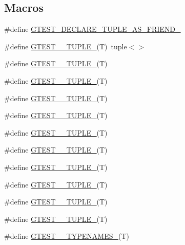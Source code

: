 \subsection*{Macros}
\begin{DoxyCompactItemize}
\item 
\#define \mbox{\hyperlink{gtest-tuple_8h_a2b20671273f514a88a6e9b8328e5f257}{G\+T\+E\+S\+T\+\_\+\+D\+E\+C\+L\+A\+R\+E\+\_\+\+T\+U\+P\+L\+E\+\_\+\+A\+S\+\_\+\+F\+R\+I\+E\+N\+D\+\_\+}}
\item 
\#define \mbox{\hyperlink{gtest-tuple_8h_acecddf48fa29ec4b0199d5a467e89778}{G\+T\+E\+S\+T\+\_\+\_\+\+T\+U\+P\+L\+E\+\_\+}}(T)~tuple$<$$>$
\item 
\#define \mbox{\hyperlink{gtest-tuple_8h_a544374090885c4127adc2c618570323c}{G\+T\+E\+S\+T\+\_\+\_\+\+T\+U\+P\+L\+E\+\_\+}}(T)
\item 
\#define \mbox{\hyperlink{gtest-tuple_8h_a93229c3f009273c73eca237b4d19f326}{G\+T\+E\+S\+T\+\_\+\_\+\+T\+U\+P\+L\+E\+\_\+}}(T)
\item 
\#define \mbox{\hyperlink{gtest-tuple_8h_af2c3eab3f1a5197b408fce44eb3ed9da}{G\+T\+E\+S\+T\+\_\+\_\+\+T\+U\+P\+L\+E\+\_\+}}(T)
\item 
\#define \mbox{\hyperlink{gtest-tuple_8h_a3625feb24d5e6eb9926fd558e4a2e3ff}{G\+T\+E\+S\+T\+\_\+\_\+\+T\+U\+P\+L\+E\+\_\+}}(T)
\item 
\#define \mbox{\hyperlink{gtest-tuple_8h_a64e6f4a4cf55f62cde94066c6d5d5c74}{G\+T\+E\+S\+T\+\_\+\_\+\+T\+U\+P\+L\+E\+\_\+}}(T)
\item 
\#define \mbox{\hyperlink{gtest-tuple_8h_a53f36c86a979ed8285bf3c6f82f16483}{G\+T\+E\+S\+T\+\_\+\_\+\+T\+U\+P\+L\+E\+\_\+}}(T)
\item 
\#define \mbox{\hyperlink{gtest-tuple_8h_a8987baf82ee028d1d778447413a02c0c}{G\+T\+E\+S\+T\+\_\+\_\+\+T\+U\+P\+L\+E\+\_\+}}(T)
\item 
\#define \mbox{\hyperlink{gtest-tuple_8h_a2bc36d1a71a551e6cda2ac5504fb7ce3}{G\+T\+E\+S\+T\+\_\+\_\+\+T\+U\+P\+L\+E\+\_\+}}(T)
\item 
\#define \mbox{\hyperlink{gtest-tuple_8h_a1a81c17bfe3cdceb4d56b15985a44a7e}{G\+T\+E\+S\+T\+\_\+\_\+\+T\+U\+P\+L\+E\+\_\+}}(T)
\item 
\#define \mbox{\hyperlink{gtest-tuple_8h_a275e7bcd84299cc44b9c1dba971951c4}{G\+T\+E\+S\+T\+\_\+\_\+\+T\+U\+P\+L\+E\+\_\+}}(T)
\item 
\#define \mbox{\hyperlink{gtest-tuple_8h_ac6784ade57659fbc58baa03c265ca0ac}{G\+T\+E\+S\+T\+\_\+\_\+\+T\+Y\+P\+E\+N\+A\+M\+E\+S\+\_\+}}(T)
$$
\end{DoxyCompactItemize}
